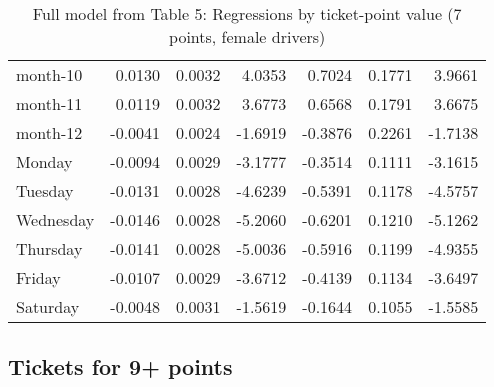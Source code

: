 \documentclass[10pt]{article}
\begin{document}
\begin{table}[ht]
\begin{tabular}{lrrrrrr}
  month-10 & 0.0130 & 0.0032 & 4.0353 & 0.7024 & 0.1771 & 3.9661 \\ 
  month-11 & 0.0119 & 0.0032 & 3.6773 & 0.6568 & 0.1791 & 3.6675 \\ 
  month-12 & -0.0041 & 0.0024 & -1.6919 & -0.3876 & 0.2261 & -1.7138 \\ 
  Monday & -0.0094 & 0.0029 & -3.1777 & -0.3514 & 0.1111 & -3.1615 \\ 
  Tuesday & -0.0131 & 0.0028 & -4.6239 & -0.5391 & 0.1178 & -4.5757 \\ 
  Wednesday & -0.0146 & 0.0028 & -5.2060 & -0.6201 & 0.1210 & -5.1262 \\ 
  Thursday & -0.0141 & 0.0028 & -5.0036 & -0.5916 & 0.1199 & -4.9355 \\ 
  Friday & -0.0107 & 0.0029 & -3.6712 & -0.4139 & 0.1134 & -3.6497 \\ 
  Saturday & -0.0048 & 0.0031 & -1.5619 & -0.1644 & 0.1055 & -1.5585 \\ 
   \hline
\end{tabular}
\caption{Full model from Table 5: Regressions by ticket-point value (7 points, female drivers)} 
\label{tab_5_7_pts_no_age_F}
\end{table}


\clearpage
\pagebreak




\subsection{Tickets for 9+ points}



\end{document}
